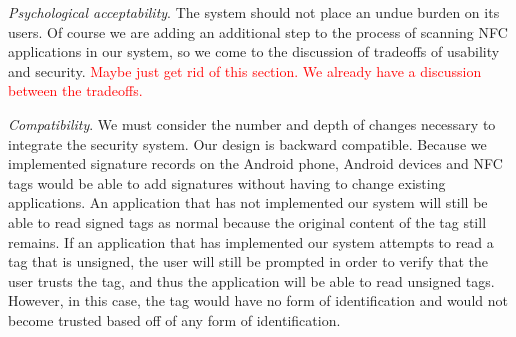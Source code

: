 \documentclass[12pt]{article}
\newcommand\todo[1]{\textcolor{red}{#1}}
\begin{document}


{\it Psychological acceptability}. The system should not place an undue burden on its users. Of course we are adding an additional step to the process of scanning NFC applications in our system, so we come to the discussion of tradeoffs of usability and security. \todo{Maybe just get rid of this section. We already have a discussion between the tradeoffs.}


{\it Compatibility}. We must consider the number and depth of changes necessary to integrate the security system. Our design is backward compatible. Because we implemented signature records on the Android phone, Android devices and NFC tags would be able to add signatures without having to change existing applications. An application that has not implemented our system will still be able to read signed tags as normal because the original content of the tag still remains. If an application that has implemented our system attempts to read a tag that is unsigned, the user will still be prompted in order to verify that the user trusts the tag, and thus the application will be able to read unsigned tags. However, in this case, the tag would have no form of identification and would not become trusted based off of any form of identification.   
\end{document}
